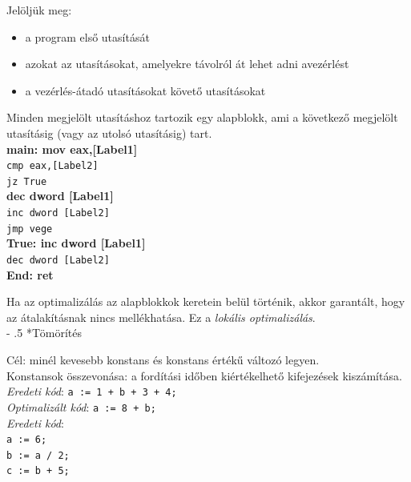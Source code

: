 \documentclass[12pt,margin=0px]{article}
\makeatletter
\renewcommand\paragraph{%
	\@startsection{paragraph}{4}{0mm}%
	{-\baselineskip}%
	{.5\baselineskip}%
	{\normalfont\normalsize\bfseries}}
\makeatother
\begin{document}
    \noindent Jelöljük meg:
    \begin{itemize}
        \item a program első utasítását
        \item azokat az utasításokat, amelyekre távolról át lehet adni avezérlést
        \item a vezérlés-átadó utasításokat követő utasításokat
    \end{itemize}

    \noindent Minden megjelölt utasításhoz tartozik egy alapblokk, ami a következő megjelölt utasításig (vagy az utolsó utasításig) tart.\\

    \noindent \textbf{main: mov eax,[Label1]}\\
        \texttt{cmp eax,[Label2]}\\
        \texttt{jz True}\\
        \textbf{dec dword [Label1]}\\
        \texttt{inc dword [Label2]}\\
        \texttt{jmp vege}\\
    \textbf{True: inc dword [Label1]}\\
        \texttt{dec dword [Label2]}\\
    \textbf{End: ret}

	\noindent Ha az optimalizálás az alapblokkok keretein belül történik, akkor garantált, hogy az átalakításnak nincs mellékhatása. Ez a \emph{lokális optimalizálás}.\\

    \paragraph*{Tömörítés}

    \noindent Cél: minél kevesebb konstans és konstans értékű változó legyen.\\
    \noindent Konstansok összevonása: a fordítási időben kiértékelhető kifejezések kiszámítása.\\

    \noindent \emph{Eredeti kód}: \texttt{a := 1 + b + 3 + 4;}\\
    \noindent \emph{Optimalizált kód}: \texttt{a := 8 + b;}\\
	
    \noindent \emph{Eredeti kód}:\\
    \texttt{a := 6;}\\
    \texttt{b := a / 2;}\\
    \texttt{c := b + 5;}\\
\end{document}
